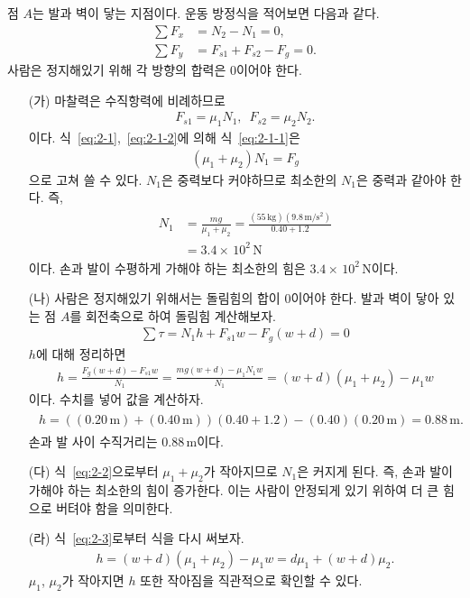 \documentclass[floatfix,nofootinbib,superscriptaddress,fleqn]{revtex4-2}
\begin{document}
점 $A$는 발과 벽이 닿는 지점이다.
운동 방정식을 적어보면 다음과 같다.
\begin{align}
  \label{eq:2-1}\sum F_x &= N_{2}-N_{1} = 0,  \\
  \label{eq:2-1-1}\sum F_y &= F_{s1}+F_{s2}-F_g = 0.
\end{align}
사람은 정지해있기 위해 각 방향의 합력은 $0$이어야 한다.
\begin{itemize}
  \item[(가)] 마찰력은 수직항력에 비례하므로
  \begin{align}\label{eq:2-1-2}
    F_{s1} = \mu_1N_1,\,\,\,
    F_{s2} = \mu_2N_2.
  \end{align}
  이다. 식~\eqref{eq:2-1},~\eqref{eq:2-1-2}에 의해 
  식~\eqref{eq:2-1-1}은
  \begin{align}
    (\mu_1+\mu_2)N_1 =F_g
  \end{align}
  으로 고쳐 쓸 수 있다.
  $N_1$은 중력보다 커야하므로 최소한의 $N_1$은 중력과 같아야 한다. 즉,
  \begin{align}\label{eq:2-2}
    \begin{split}
      N_1 &= \frac{mg}{\mu_1+\mu_2}
      = \frac{(55\,\mathrm{kg})(9.8\,\mathrm{m/s^2})}{0.40+1.2} \\
      &= 3.4\times\,10^2\,\mathrm{N}
    \end{split}
  \end{align}
  이다. 손과 발이 수평하게 가해야 하는 최소한의 힘은 
  $3.4\times\,10^2\,\mathrm{N}$이다.
  \item[(나)] 
  사람은 정지해있기 위해서는 돌림힘의 합이 $0$이어야 한다. 
  발과 벽이 닿아 있는 점 $A$를 회전축으로 하여
  돌림힘 계산해보자.
  \begin{align}
    \sum \tau = N_1 h + F_{s1} w - F_g(w+d) = 0
  \end{align}
  $h$에 대해 정리하면
  \begin{align}\label{eq:2-3}
    h = \frac{F_g(w+d)-F_{s1} w}{N_1}
    =\frac{mg(w+d)-\mu_1N_1 w}{N_1}
    =(w+d)(\mu_1+\mu_2) - \mu_1 w
  \end{align}
  이다. 수치를 넣어 값을 계산하자.
  \begin{align}
    \begin{split}
      h=((0.20\,\mathrm{m})+(0.40\,\mathrm{m}))(0.40+1.2) 
      - (0.40)(0.20\,\mathrm{m})
      =0.88\,\mathrm{m}.
    \end{split}
  \end{align}
  손과 발 사이 수직거리는 $0.88\,\mathrm{m}$이다.
  \item[(다)]
  식~\eqref{eq:2-2}으로부터 $\mu_1+\mu_2$가 작아지므로 
  $N_1$은 커지게 된다. 즉, 손과 발이 가해야 하는 최소한의 힘이 증가한다.
  이는 사람이 안정되게 있기 위하여 더 큰 힘으로 버텨야 함을 의미한다.
  \item[(라)]
  식~\eqref{eq:2-3}로부터 식을 다시 써보자.
  \begin{align}
    h=(w+d)(\mu_1+\mu_2) - \mu_1 w
    =d\mu_1 + (w+d)\mu_2.
  \end{align}
  $\mu_1$, $\mu_2$가 작아지면 $h$ 또한 작아짐을 직관적으로 확인할 수 있다.
\end{itemize}
\end{document}
